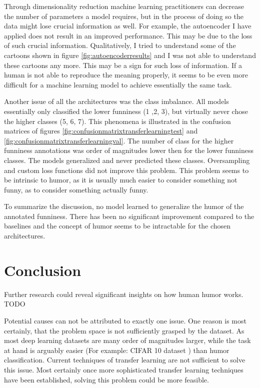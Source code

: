 \documentclass[draft,final,oneside]{vutinfth} %
\begin{document}
Through dimensionality reduction machine learning practitioners can decrease the number of parameters a model requires, but in the process of doing so the data might lose crucial information as well. For example, the autoencoder I have applied does not result in an improved performance. This may be due to the loss of such crucial information. Qualitatively, I tried to understand some of the cartoons shown in figure \ref{fig:autoencoderresults} and I was not able to understand these cartoons any more. This may be a sign for such loss of information. If a human is not able to reproduce the meaning properly, it seems to be even more difficult for a machine learning model to achieve essentially the same task.

Another issue of all the architectures was the class imbalance. All models essentially only classified the lower funniness (1 ,2, 3), but virtually never chose the higher classes (5, 6, 7). This phenomena is illustrated in the confusion matrices of figures \ref{fig:confusionmatrixtransferlearningtest} and \ref{fig:confusionmatrixtransferlearningval}. The number of class for the higher funniness annotations was order of magnitudes lower then for the lower funniness classes. The models generalized and never predicted these classes. Oversampling and custom loss functions did not improve this problem. This problem seems to be intrinsic to humor, as it is usually much easier to consider something not funny, as to consider something actually funny.

To summarize the discussion, no model learned to generalize the humor of the annotated funniness. There has been no significant improvement compared to the baselines and the concept of humor seems to be intractable for the chosen architectures.


\chapter {Conclusion}
Further research could reveal significant insights on how human humor works.  TODO

Potential causes can not be attributed to exactly one issue. One reason is most certainly, that the problem space is not sufficiently grasped by the dataset. As most deep learning datasets are many order of magnitudes larger, while the task at hand is arguably easier (For example: CIFAR 10 dataset \cite{dogsvscats}) than humor classification. Current techniques of transfer learning are not sufficient to solve this issue. Most certainly once more sophisticated transfer learning techniques have been established, solving this problem could be more feasible. 
\end{document}
